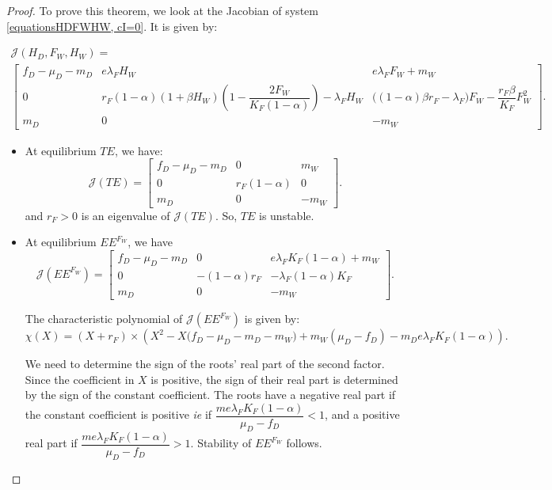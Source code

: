 \documentclass{article}
\newcommand{\lfw}{\lambda_{F}}
\newcommand{\lfw}{\lambda_{F}}
\begin{document}
\begin{proof}
To prove this theorem, we look at the Jacobian of system \eqref{equationsHDFWHW, cI=0}. It is given by:

\begin{multline*}
\mathcal{J}(H_D, F_W, H_W) = \\
\begin{bmatrix}
f_D-\mu_D - m_D & e \lfw H_W & e\lfw F_W + m_W \\
0 & r_F(1-\alpha)(1+\beta H_W) \left( 1 - \dfrac{2F_W}{K_F(1-\alpha)} \right) - \lfw H_W & \Big((1-\alpha)\beta r_F - \lfw \Big) F_W -  \dfrac{r_F\beta}{K_F} F_W^2\\
m_D & 0 & -m_W
\end{bmatrix}.
\end{multline*}

\begin{itemize}
\item At equilibrium $TE$, we have:
\begin{equation*}
\mathcal{J}(TE) = \begin{bmatrix}
f_D-\mu_D - m_D & 0 &  m_W \\
0 & r_F(1-\alpha)  &  0\\
m_D & 0 & -m_W
\end{bmatrix}.
\end{equation*}
and $r_F > 0$ is an eigenvalue of $\mathcal{J}(TE)$. So, $TE$ is unstable.
\item At equilibrium $EE^{F_W}$, we have
\begin{equation*}
\mathcal{J}(EE^{F_W}) = \begin{bmatrix}
f_D-\mu_D - m_D & 0 & e\lfw K_F(1-\alpha) + m_W \\
0 & -(1-\alpha)r_F  & -\lfw(1-\alpha)K_F  \\
m_D & 0 & -m_W
\end{bmatrix}.
\end{equation*}

The characteristic polynomial of $\mathcal{J}(EE^{F_W})$ is given by:
\begin{equation*}
\chi(X) = (X +r_F) \times \left(X^2 - X\Big(f_D - \mu_D - m_D - m_W \Big) + m_W(\mu_D - f_D) - m_D e \lfw K_F(1-\alpha) \right).
\end{equation*}

We need to determine the sign of the roots' real part of the second factor. Since the coefficient in $X$ is positive, the sign of their real part is determined by the sign of the constant coefficient.
The roots have a negative real part if the constant coefficient is positive \textit{ie} if $\dfrac{m e \lfw K_F(1-\alpha)}{\mu_D - f_D} < 1 $, and a positive real part if $\dfrac{m e \lfw K_F(1-\alpha)}{\mu_D - f_D} > 1 $. Stability of $EE^{F_W}$ follows.


\end{itemize}
\end{proof}
\end{document}
